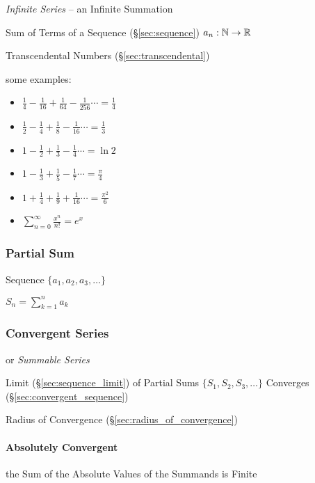 \emph{Infinite Series} -- an Infinite Summation

Sum of Terms of a Sequence (\S\ref{sec:sequence}) $a_n : \mathbb{N}
\rightarrow \mathbb{R}$

Transcendental Numbers (\S\ref{sec:transcendental})

some examples:
\begin{itemize}
  \item $\frac{1}{4} - \frac{1}{16} + \frac{1}{64} - \frac{1}{256} \cdots
    = \frac{1}{4}$
  \item $\frac{1}{2} - \frac{1}{4} + \frac{1}{8} - \frac{1}{16} \cdots
    = \frac{1}{3}$
  \item $1 - \frac{1}{2} + \frac{1}{3} - \frac{1}{4} \cdots  = \ln{2}$
  \item $1 - \frac{1}{3} + \frac{1}{5} - \frac{1}{7} \cdots  = \frac{\pi}{4}$
  \item $1 + \frac{1}{4} + \frac{1}{9} + \frac{1}{16} \cdots = \frac{\pi^2}{6}$
  \item $\sum_{n=0}^\infty \frac{x^n}{n!} = e^x$
\end{itemize}



\subsubsection{Partial Sum}\label{sec:partial_sum}

Sequence $\{ a_1, a_2, a_3, \ldots \}$

$S_n = \sum_{k=1}^n a_k$



\subsubsection{Convergent Series}\label{sec:convergent_series}

or \emph{Summable Series}

Limit (\S\ref{sec:sequence_limit}) of Partial Sums $\{ S_1, S_2, S_3,
\ldots \}$ Converges (\S\ref{sec:convergent_sequence})

\fist Radius of Convergence (\S\ref{sec:radius_of_convergence})



\paragraph{Absolutely Convergent}\label{sec:absolutely_convergent}\hfill

the Sum of the Absolute Values of the Summands is Finite

